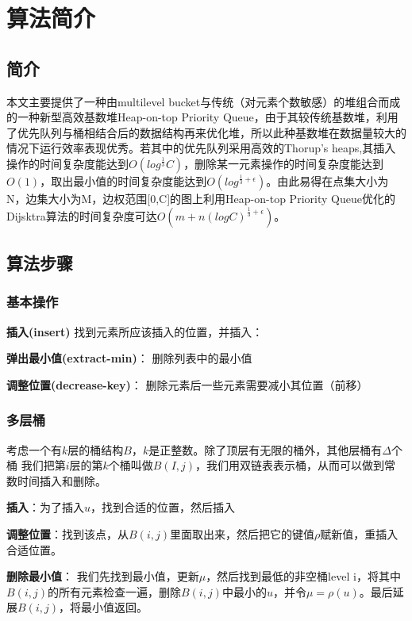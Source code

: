 
\chapter{算法简介}

\section{简介}
本文主要提供了一种由multilevel bucket与传统（对元素个数敏感）的堆组合而成的一种新型高效基数堆Heap-on-top Priority Queue，由于其较传统基数堆，利用了优先队列与桶相结合后的数据结构再来优化堆，所以此种基数堆在数据量较大的情况下运行效率表现优秀。若其中的优先队列采用高效的Thorup’s heaps\cite{Thorup1996On},其插入操作的时间复杂度能达到$O(log^{\frac{1}{3}}C)$，删除某一元素操作的时间复杂度能达到$O(1)$，取出最小值的时间复杂度能达到$O(log^{\frac{1}{3}+\epsilon})$。由此易得在点集大小为N，边集大小为M，边权范围[0,C]的图上利用Heap-on-top Priority Queue优化的Dijsktra算法的时间复杂度可达$O(m+n(logC)^{\frac{1}{3}+\epsilon})$。


\section{算法步骤}

\subsection{基本操作}

\textbf{插入(insert)}
找到元素所应该插入的位置，并插入：
\par
\textbf{弹出最小值(extract-min)}：
删除列表中的最小值
\par
\textbf{调整位置(decrease-key)}：
删除元素后一些元素需要减小其位置（前移）

\subsection{多层桶}
考虑一个有$k$层的桶结构$B$，$k$是正整数。除了顶层有无限的桶外，其他层桶有$\Delta$个桶
我们把第$i$层的第$k$个桶叫做$B(I,j)$，我们用双链表表示桶，从而可以做到常数时间插入和删除。
\par
\textbf{插入}：为了插入$u$，找到合适的位置，然后插入
\par
\textbf{调整位置}：找到该点，从$B(i,j)$里面取出来，然后把它的键值$\rho$赋新值，重插入合适位置。
\par
\textbf{删除最小值}：
我们先找到最小值，更新$\mu $，然后找到最低的非空桶level i，将其中$B(i,j)$的所有元素检查一遍，删除$B(i,j)$中最小的$u$，并令$\mu = \rho (u)$。最后延展$B(i,j)$，将最小值返回。

